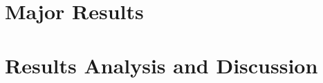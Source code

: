 
\section{Major Results}
    \label{sec:major_res}
    

\section{Results Analysis and Discussion}
    